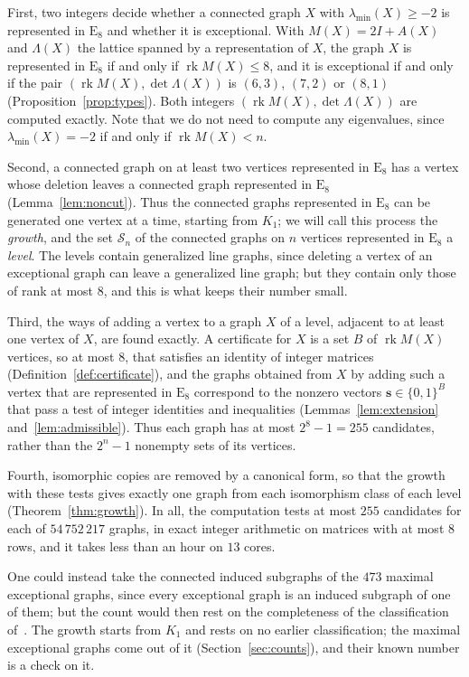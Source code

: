 \documentclass[11pt]{article}
\newcommand\cS{{\mathcal S}}
\newcommand\opk[1]{\mathop{\mathrm{#1}}\nolimits}
\newcommand\rk{\opk{rk}}
\theoremstyle{definition}
\newcommand{\typ}[1]{\mathrm{#1}}
\newcommand{\lmin}{\lambda_{\min}}
\newcommand\Zs{{\mathbf s}}
\begin{document}
First, two integers decide whether a connected graph $X$ with $\lmin(X)\ge-2$ is represented
in $\typ E_8$ and whether it is exceptional. With $M(X)=2I+A(X)$ and $\Lambda(X)$ the lattice
spanned by a representation of $X$, the graph $X$ is represented in $\typ E_8$ if and only if
$\rk M(X)\le8$, and it is exceptional if and only if the pair $(\rk M(X),\det\Lambda(X))$ is
$(6,3)$, $(7,2)$ or $(8,1)$ (Proposition~\ref{prop:types}). Both integers
$(\rk M(X),\det\Lambda(X))$ are computed exactly. Note that we do not need to compute any
eigenvalues, since $\lmin(X)=-2$ if and only if $\rk M(X)<n$.

Second, a connected graph on at least two vertices represented in $\typ E_8$ has a vertex whose
deletion leaves a connected graph represented in $\typ E_8$ (Lemma~\ref{lem:noncut}). Thus the
connected graphs represented in $\typ E_8$ can be generated one vertex at a time, starting from
$K_1$; we will call this process the \textsl{growth}, and the set $\cS_n$ of the connected graphs
on $n$ vertices represented in $\typ E_8$ a \textsl{level}. The levels contain generalized line
graphs, since deleting a vertex of an exceptional graph can leave a generalized line graph; but
they contain only those of rank at most $8$, and this is what keeps their number small.

Third, the ways of adding a vertex to a graph $X$ of a level, adjacent to at least one vertex
of $X$, are found exactly. A certificate for $X$ is a set $B$ of $\rk M(X)$ vertices, so at most
$8$, that satisfies an identity of integer matrices (Definition~\ref{def:certificate}), and the
graphs obtained from $X$ by adding such a vertex that are represented in $\typ E_8$ correspond to
the nonzero vectors $\Zs\in\{0,1\}^B$ that pass a test of integer identities and inequalities
(Lemmas~\ref{lem:extension} and~\ref{lem:admissible}). Thus each graph has at most $2^8-1=255$
candidates, rather than the $2^n-1$ nonempty sets of its vertices.

Fourth, isomorphic copies are removed by a canonical form, so that the growth with these tests
gives exactly one graph from each isomorphism class of each level (Theorem~\ref{thm:growth}). In
all, the computation tests at most $255$ candidates for each of $54\,752\,217$
graphs, in exact integer arithmetic on matrices with at most $8$ rows, and it takes less than an
hour on $13$ cores.

One could instead take the connected induced subgraphs of the $473$ maximal exceptional graphs,
since every exceptional graph is an induced subgraph of one of them; but the count would then
rest on the completeness of the classification of~\cite{CLRS02}. The growth starts from $K_1$
and rests on no earlier classification; the maximal exceptional graphs come out of it
(Section~\ref{sec:counts}), and their known number is a check on it.
\end{document}
